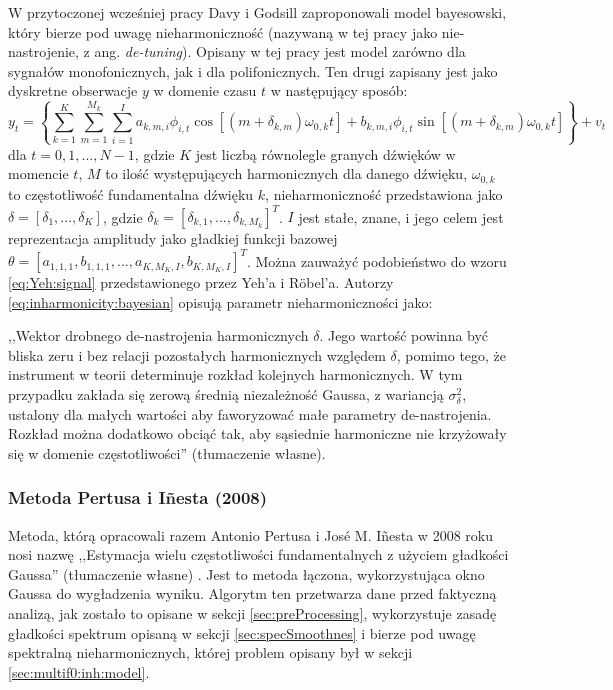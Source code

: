\documentclass[12pt,a4paper,twoside]{mwart}
\begin{document}
W przytoczonej wcześniej pracy 
\cite[1-10]{Transcription:BayesianHarmonicModels}
 Davy i Godsill zaproponowali model bayesowski, który bierze pod uwagę nieharmoniczność (nazywaną w tej pracy jako nie-nastrojenie, z ang. \textit{de-tuning}). Opisany w tej pracy jest model zarówno dla sygnałów monofonicznych, jak i dla polifonicznych. Ten drugi zapisany jest jako dyskretne obserwacje $y$ w domenie czasu $t$ w następujący sposób:
\begin{equation}\label{eq:inharmonicity:bayesian}
  y_t = \left\{ \sum_{k=1}^{K}\sum_{m=1}^{M_k}\sum_{i=1}^{I} a_{k,m,i} \phi_{i,t}\cos[(m + \delta_{k,m})\omega_{0,k}t] + b_{k,m,i}\phi_{i,t}\sin[(m + \delta_{k,m})\omega_{0,k}t]\right\} + v_t
\end{equation}
dla $t = 0,1,...,N-1$, gdzie $K$ jest liczbą równolegle granych dźwięków w momencie $t$, $M$ to ilość występujących harmonicznych dla danego dźwięku, $\omega_{0,k}$ to częstotliwość fundamentalna dźwięku $k$, nieharmoniczność przedstawiona jako $\delta = [\delta_1, ..., \delta_K]$, gdzie $\delta_k = [\delta_{k,1}, ..., \delta_{k, M_{k}}]^T$. $I$ jest stałe, znane, i jego celem jest reprezentacja amplitudy jako gładkiej funkcji bazowej $\theta = [a_{1,1,1}, b_{1,1,1}, ..., a_{K, M_{K},I}, b_{K, M_{K},I}]^T$. Można zauważyć podobieństwo do wzoru  \ref{eq:Yeh:signal} przedstawionego przez Yeh'a i Röbel'a. Autorzy \ref{eq:inharmonicity:bayesian} opisują parametr nieharmoniczności jako:
\begin{displayquote}
,,Wektor drobnego de-nastrojenia harmonicznych $\delta$. Jego wartość powinna być bliska zeru i bez relacji pozostałych harmonicznych względem $\delta$, pomimo tego, że instrument w teorii determinuje rozkład kolejnych harmonicznych. W tym przypadku zakłada się zerową średnią niezależność Gaussa, z wariancją $\sigma_{\delta}^{2}$, ustalony dla małych wartości aby faworyzować małe parametry de-nastrojenia. Rozkład można dodatkowo obciąć tak, aby sąsiednie harmoniczne nie krzyżowały się w domenie częstotliwości'' 
\cite[9]{Transcription:BayesianHarmonicModels}
(tłumaczenie własne).
\end{displayquote}
\subsubsection{Metoda Pertusa i Iñesta (2008)} \label{sec:pertus1}
Metoda, którą opracowali razem Antonio Pertusa i José M. Iñesta w 2008 roku nosi nazwę ,,Estymacja wielu częstotliwości fundamentalnych z użyciem gładkości Gaussa'' (tłumaczenie własne) \cite{Transcription:Pertus:Inharmonicity}. Jest to metoda łączona, wykorzystująca okno Gaussa do wygładzenia wyniku. Algorytm ten przetwarza dane przed faktyczną analizą, jak zostało to opisane w sekcji \ref{sec:preProcessing}, wykorzystuje zasadę gładkości spektrum opisaną w sekcji \ref{sec:specSmoothnes} i bierze pod uwagę spektralną nieharmonicznych, której problem opisany był w sekcji \ref{sec:multif0:inh:model}.
\end{document}

